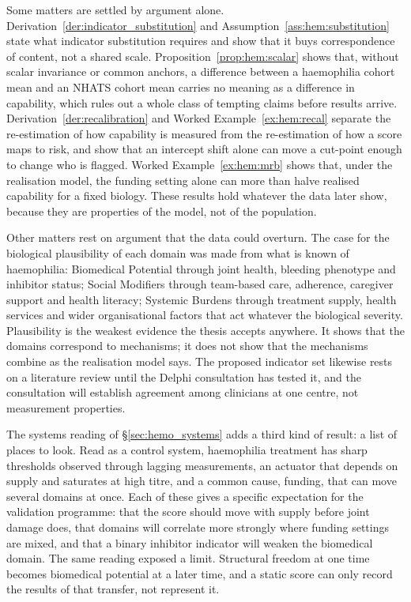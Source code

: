 Some matters are settled by argument alone. Derivation~\ref{der:indicator_substitution} and Assumption~\ref{ass:hem:substitution} state what indicator substitution requires and show that it buys correspondence of content, not a shared scale. Proposition~\ref{prop:hem:scalar} shows that, without scalar invariance or common anchors, a difference between a haemophilia cohort mean and an NHATS cohort mean carries no meaning as a difference in capability, which rules out a whole class of tempting claims before results arrive. Derivation~\ref{der:recalibration} and Worked Example~\ref{ex:hem:recal} separate the re-estimation of how capability is measured from the re-estimation of how a score maps to risk, and show that an intercept shift alone can move a cut-point enough to change who is flagged. Worked Example~\ref{ex:hem:mrb} shows that, under the realisation model, the funding setting alone can more than halve realised capability for a fixed biology. These results hold whatever the data later show, because they are properties of the model, not of the population.

Other matters rest on argument that the data could overturn. The case for the biological plausibility of each domain was made from what is known of haemophilia: Biomedical Potential through joint health, bleeding phenotype and inhibitor status; Social Modifiers through team-based care, adherence, caregiver support and health literacy; Systemic Burdens through treatment supply, health services and wider organisational factors that act whatever the biological severity. Plausibility is the weakest evidence the thesis accepts anywhere. It shows that the domains correspond to mechanisms; it does not show that the mechanisms combine as the realisation model says. The proposed indicator set likewise rests on a literature review until the Delphi consultation has tested it, and the consultation will establish agreement among clinicians at one centre, not measurement properties.

The systems reading of \S\ref{sec:hemo_systems} adds a third kind of result: a list of places to look. Read as a control system, haemophilia treatment has sharp thresholds observed through lagging measurements, an actuator that depends on supply and saturates at high titre, and a common cause, funding, that can move several domains at once. Each of these gives a specific expectation for the validation programme: that the score should move with supply before joint damage does, that domains will correlate more strongly where funding settings are mixed, and that a binary inhibitor indicator will weaken the biomedical domain. The same reading exposed a limit. Structural freedom at one time becomes biomedical potential at a later time, and a static score can only record the results of that transfer, not represent it.

